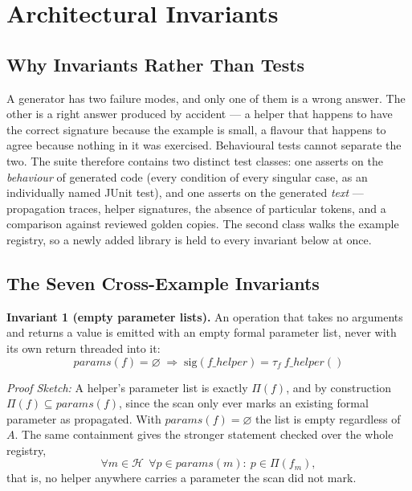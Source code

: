 \documentclass[conference]{IEEEtran}
\begin{document}
\section{Architectural Invariants}
\label{sec:invariants}

\subsection{Why Invariants Rather Than Tests}

A generator has two failure modes, and only one of them is a wrong answer. The other
is a right answer produced by accident --- a helper that happens to have the correct
signature because the example is small, a flavour that happens to agree because
nothing in it was exercised. Behavioural tests cannot separate the two. The suite
therefore contains two distinct test classes: one asserts on the \emph{behaviour} of
generated code (every condition of every singular case, as an individually named
JUnit test), and one asserts on the generated \emph{text} --- propagation traces,
helper signatures, the absence of particular tokens, and a comparison against
reviewed golden copies. The second class walks the example registry, so a newly
added library is held to every invariant below at once.

\subsection{The Seven Cross-Example Invariants}

\textbf{Invariant 1 (empty parameter lists).} An operation that takes no arguments
and returns a value is emitted with an empty formal parameter list, never with its
own return threaded into it:
\begin{equation}
\mathit{params}(f)=\varnothing \;\Rightarrow\; \mathrm{sig}(f\_\mathit{helper})=\tau_f\ f\_\mathit{helper}()
\end{equation}

\textit{Proof Sketch:} A helper's parameter list is exactly $\Pi(f)$, and by
construction $\Pi(f)\subseteq\mathit{params}(f)$, since the scan only ever marks an
existing formal parameter as propagated. With $\mathit{params}(f)=\varnothing$ the
list is empty regardless of $A$. The same containment gives the stronger statement
checked over the whole registry,
\begin{equation}
\forall m\in\mathcal{H}\ \ \forall p\in\mathit{params}(m):\ p\in\Pi(f_m),
\end{equation}
that is, no helper anywhere carries a parameter the scan did not mark.
\end{document}

